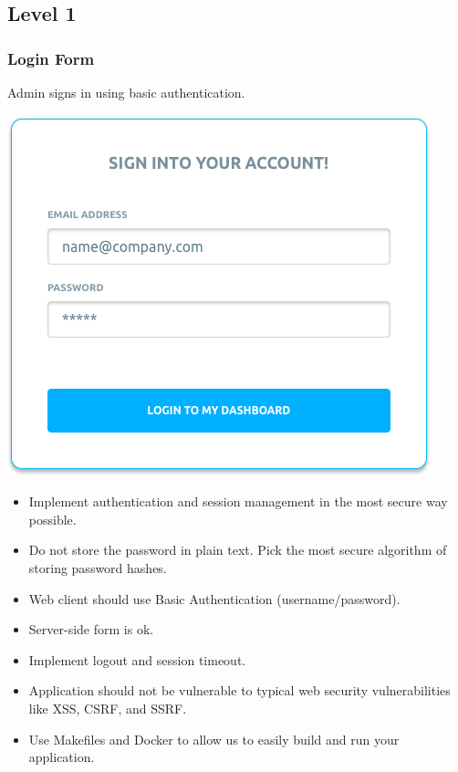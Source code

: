 \documentclass{article}
\begin{document}
  \subsection*{Level 1}

  \subsubsection*{Login Form}
  
  Admin signs in using basic authentication.

  \begin{center}
    \includegraphics[width=\textwidth]{login}
  \end{center}

  \begin{itemize} 
  \item Implement authentication and session management in the most secure way possible.
  \item Do not store the password in plain text. Pick the most secure algorithm of storing password hashes.
  \item Web client should use Basic Authentication (username/password).
  \item Server-side form is ok.
  \item Implement logout and session timeout.
  \item Application should not be vulnerable to typical web security vulnerabilities like XSS, CSRF, and SSRF.
  \item Use Makefiles and Docker to allow us to easily build and run your application.
  \end{itemize}
\end{document}
